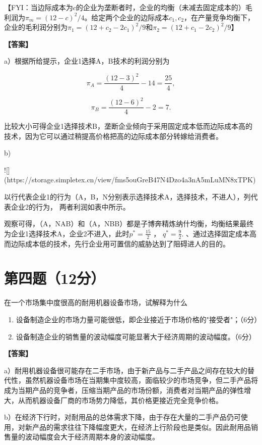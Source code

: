 \documentclass[12pt]{article}
\begin{document}
【FYI：当边际成本为$c$的企业为垄断者时，企业的均衡（未减去固定成本的）毛利润为$\pi_m=(12-c)^2/4$。给定两个企业的边际成本$c_1,c_2$，在产量竞争均衡下，企业的毛利润分别为$\pi_1=(12+c_2-2c_1)^2/9$和$\pi_2=(12+c_1-2c_2)^2/9$】

\noindent\textbf{【答案】}

a）根据所给提示，企业1选择A，B技术的利润分别为

$$\pi_A=\frac{(12-3)^2}{4}-14=\frac{25}{4},$$

$$\pi_B=\frac{(12-6)^2}{4}-2=7.$$

比较大小可得企业1选择技术B，垄断企业倾向于采用固定成本低而边际成本高的技术，因为它可以通过稍提高价格把高的边际成本部分转嫁给消费者。

b)

![](https://storage.simpletex.cn/view/fms5ouGreB47N4Dzo4a3nA5mLuMN8xTPK)

以行代表企业1的行为（A，B，N分别表示选择技术A，选择技术，不进人），列代表企业2的行为， 两者利润如表中所示。

观察可得，（A，NAB）和（A，NBB）都是子博奔精炼纳什均衡，均衡结果最终为企业1选择技术A，企业2不进入，此时$p^*=\frac{15}2$ ， $q^*=\frac92.$ 、通过选择固定成本高而边际成本低的技术，先行企业用可置信的威胁达到了阻碍进人的目的。

\section*{第四题（12分）}
在一个市场集中度很高的耐用机器设备市场，试解释为什么

\begin{enumerate}
\item 设备制造企业的市场力量可能很低，即企业接近于市场价格的"接受者"；（6分）

\item 设备制造企业的销售量的波动幅度可能显著大于经济周期的波动幅度。（6分）
\end{enumerate}

\noindent\textbf{【答案】}

a）耐用机器设备很可能存在二手市场，由于新产品与二手产品之间存在较大的替代性，虽然机器设备市场在当期集中度较高，面临较少的市场竞争，但二手产品将成为当期产品的竞争者，压缩当期产品的市场份额，消费者对当期产品的弹性增大，从而机器设备厂商的市场势力降低，其价格更接近完全竞争价格。

b）在经济下行时，对耐用品的总体需求下降，由于存在大量的二手产品仍可使用，对新产品的需求往往下降幅度更大，在经济上行阶段也是类似。因此耐用品销售量的波动幅度会大于经济周期本身的波动幅度。
\end{document}
